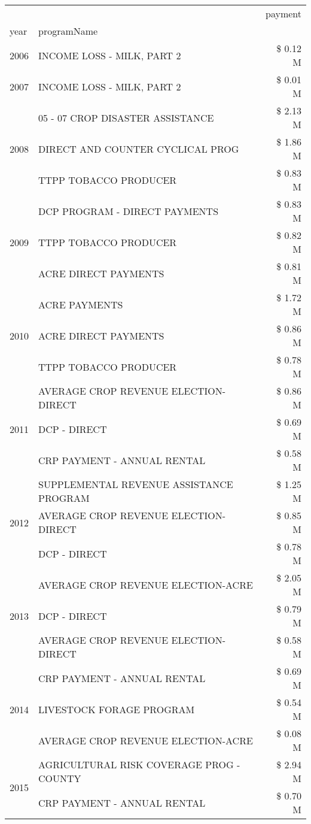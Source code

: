 \begin{tabular}{llr}
\toprule
 &  & payment \\
year & programName &  \\
\midrule
2006 & INCOME LOSS - MILK, PART 2 & \$ 0.12 M \\
\cline{1-3}
2007 & INCOME LOSS - MILK, PART 2 & \$ 0.01 M \\
\cline{1-3}
\multirow[t]{3}{*}{2008} & 05 - 07 CROP DISASTER ASSISTANCE & \$ 2.13 M \\
 & DIRECT AND COUNTER CYCLICAL PROG & \$ 1.86 M \\
 & TTPP TOBACCO PRODUCER & \$ 0.83 M \\
\cline{1-3}
\multirow[t]{3}{*}{2009} & DCP PROGRAM - DIRECT PAYMENTS & \$ 0.83 M \\
 & TTPP TOBACCO PRODUCER & \$ 0.82 M \\
 & ACRE DIRECT PAYMENTS & \$ 0.81 M \\
\cline{1-3}
\multirow[t]{3}{*}{2010} & ACRE PAYMENTS & \$ 1.72 M \\
 & ACRE DIRECT PAYMENTS & \$ 0.86 M \\
 & TTPP TOBACCO PRODUCER & \$ 0.78 M \\
\cline{1-3}
\multirow[t]{3}{*}{2011} & AVERAGE CROP REVENUE ELECTION-DIRECT & \$ 0.86 M \\
 & DCP - DIRECT & \$ 0.69 M \\
 & CRP PAYMENT - ANNUAL RENTAL & \$ 0.58 M \\
\cline{1-3}
\multirow[t]{3}{*}{2012} & SUPPLEMENTAL REVENUE ASSISTANCE PROGRAM & \$ 1.25 M \\
 & AVERAGE CROP REVENUE ELECTION-DIRECT & \$ 0.85 M \\
 & DCP - DIRECT & \$ 0.78 M \\
\cline{1-3}
\multirow[t]{3}{*}{2013} & AVERAGE CROP REVENUE ELECTION-ACRE & \$ 2.05 M \\
 & DCP - DIRECT & \$ 0.79 M \\
 & AVERAGE CROP REVENUE ELECTION-DIRECT & \$ 0.58 M \\
\cline{1-3}
\multirow[t]{3}{*}{2014} & CRP PAYMENT - ANNUAL RENTAL & \$ 0.69 M \\
 & LIVESTOCK FORAGE PROGRAM & \$ 0.54 M \\
 & AVERAGE CROP REVENUE ELECTION-ACRE & \$ 0.08 M \\
\cline{1-3}
\multirow[t]{3}{*}{2015} & AGRICULTURAL RISK COVERAGE PROG - COUNTY & \$ 2.94 M \\
 & CRP PAYMENT - ANNUAL RENTAL & \$ 0.70 M \\

\end{tabular}
